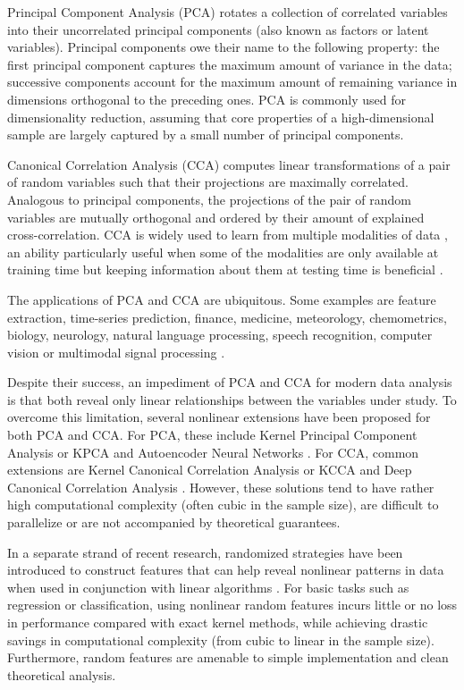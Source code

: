 \documentclass{article}
\begin{document}
  Principal Component Analysis (PCA) rotates a collection of correlated
  variables into their uncorrelated principal components (also known as factors
  or latent variables). Principal components owe their name to the following
  property: the first principal component captures the maximum amount of
  variance in the data; successive components account for the maximum amount of
  remaining variance in dimensions orthogonal to the preceding ones. PCA is
  commonly used for dimensionality reduction, assuming that core properties of
  a high-dimensional sample are largely captured by a small number of principal
  components.

  Canonical Correlation Analysis (CCA) computes linear transformations of a pair of
  random variables such that their projections are maximally correlated.
  Analogous to principal components, the projections of the pair of random
  variables are mutually orthogonal and ordered by their amount of explained
  cross-correlation. CCA is widely used to learn from multiple modalities of
  data \citep{Kakade07}, an ability particularly useful when some of the
  modalities are only available at training time but keeping information about
  them at testing time is beneficial \citep{Chaudhuri09,Vapnik09}.
  
  The applications of PCA and CCA are ubiquitous. Some examples are feature
  extraction, time-series prediction, finance, medicine, meteorology,
  chemometrics, biology, neurology, natural language processing, speech
  recognition, computer vision or multimodal signal processing
  \citep{Jolliffe02}. 
  
  Despite their success, an impediment of PCA and CCA for modern data analysis
  is that both reveal only linear relationships between the variables under
  study. To overcome this limitation, several nonlinear extensions have been
  proposed for both PCA and CCA. For PCA, these include Kernel Principal
  Component Analysis or KPCA \citep{Schoelkopf99} and Autoencoder Neural
  Networks \citep{Baldi89,Hinton06}. For CCA, common extensions are Kernel
  Canonical Correlation Analysis or KCCA \citep{laiFy00,Bach02} and Deep
  Canonical Correlation Analysis \citep{Galen13}. However, these solutions tend
  to have rather high computational complexity (often cubic in the sample
  size), are difficult to parallelize or are not accompanied by
  theoretical guarantees. 

  In a separate strand of recent research, randomized strategies have been
  introduced to construct features that can help reveal nonlinear patterns
  in data when used in conjunction with linear algorithms \citep{Rahimi08,Le13}.
  For basic tasks such as regression or classification, using nonlinear random
  features incurs little or no loss in performance compared with exact kernel
  methods, while achieving drastic savings in computational complexity (from
  cubic to linear in the sample size). Furthermore, random features are
    amenable to simple implementation and clean theoretical analysis.  
    
\end{document}
